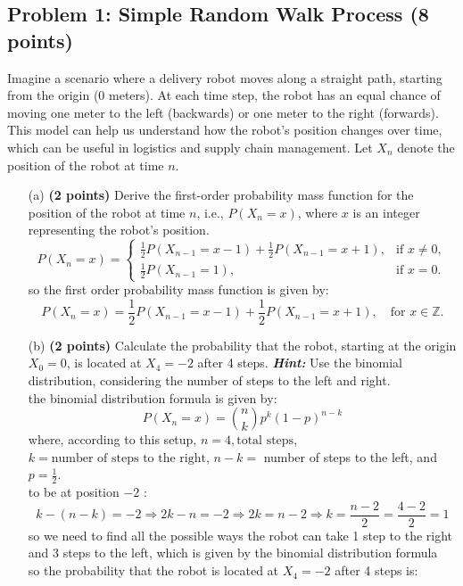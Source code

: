 \documentclass{article}
\begin{document}
\subsection*{Problem 1: Simple Random Walk Process (8 points)}
Imagine a scenario where a delivery robot moves along a straight path, starting from the origin (0 meters). At each time step, the robot has an equal chance of moving one meter to the left (backwards) or one meter to the right (forwards). This model can help us understand how the robot's position changes over time, which can be useful in logistics and supply chain management. Let \( X_n \) denote the position of the robot at time \( n \).
\begin{itemize}
    \item[(a)] \textbf{(2 points)} Derive the first-order probability mass function for the position of the robot at time \( n \), i.e., \( P(X_n = x) \), where \( x \) is an integer representing the robot's position.
    \[
    P(X_n = x) = \begin{cases}
    \frac{1}{2} P(X_{n-1} = x-1) + \frac{1}{2} P(X_{n-1} = x+1), & \text{if } x \neq 0, \\
    \frac{1}{2} P(X_{n-1} = 1), & \text{if } x = 0.
    \end{cases}
    \]
    so the first order probability mass function is given by:
    \[
    P(X_n = x) = \frac{1}{2} P(X_{n-1} = x-1) + \frac{1}{2} P(X_{n-1} = x+1), \quad \text{for } x \in \mathbb{Z}.
    \]
    \item[(b)] \textbf{(2 points)} Calculate the probability that the robot, starting at the origin \( X_0 = 0 \), is located at \( X_4 = -2 \) after 4 steps. \textbf{\textit{Hint:}} Use the binomial distribution, considering the number of steps to the left and right.
    \\ the binomial distribution formula is given by:
    \[
    P(X_n = x) = \binom{n}{k} p^k (1-p)^{n-k}
    \]
    where, according to this setup, \( n = 4, \text{total steps}\), \( k = \text{number of steps to the right} \), $n-k = $ number of steps to the left, and \( p = \frac{1}{2} \).
    \\ to be at position $-2$ :
    \[
    k - (n-k) = -2 \Rightarrow 2k - n = -2 \Rightarrow 2k = n - 2 \Rightarrow k = \frac{n-2}{2} = \frac{4-2}{2} = 1
    \]
    so we need to find all the possible ways the robot can take 1 step to the right and 3 steps to the left, which is given by the binomial distribution formula
    \\so the probability that the robot is located at \( X_4 = -2 \) after 4 steps is:

\end{itemize}
\end{document}
